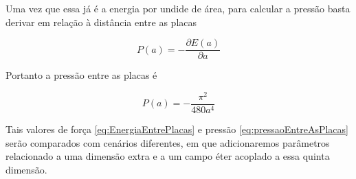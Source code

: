 Uma vez que essa já é a energia por undide de área, para calcular a pressão basta derivar em relação à distância entre as placas

\begin{equation}
P(a) = - \frac{\partial E(a)}{\partial a}
\end{equation}

Portanto a pressão entre as placas é

\begin{equation}
P(a) = - \frac{\pi^2}{480a^4} \label{eq:pressaoEntreAsPlacas}
\end{equation}

Tais valores de força \eqref{eq:EnergiaEntrePlacas} e pressão \eqref{eq:pressaoEntreAsPlacas} serão comparados com cenários diferentes, em que adicionaremos parâmetros relacionado a uma dimensão extra e a um campo éter acoplado a essa quinta dimensão.